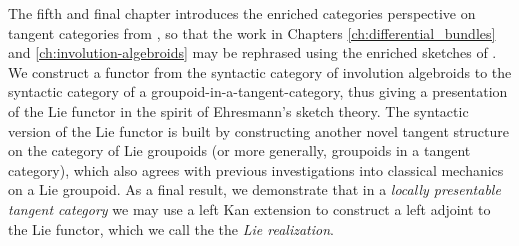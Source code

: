 The fifth and final chapter introduces the enriched categories perspective on tangent categories from \cite{Garner2018}, so that the work in Chapters \ref{ch:differential_bundles} and \ref{ch:involution-algebroids} may be rephrased using the enriched sketches of \cite{Kelly2005}.  We construct a functor from the syntactic category of involution algebroids to the syntactic category of a groupoid-in-a-tangent-category, thus giving a presentation of the Lie functor in the spirit of Ehresmann's sketch theory. The syntactic version of the Lie functor is built by constructing another novel tangent structure on the category of Lie groupoids (or more generally, groupoids in a tangent category), which also agrees with previous investigations into classical mechanics on a Lie groupoid. As a final result, we demonstrate that in a \emph{locally presentable tangent category} we may use a left Kan extension to construct a left adjoint to the Lie functor, which we call the the \emph{Lie realization}.


 
